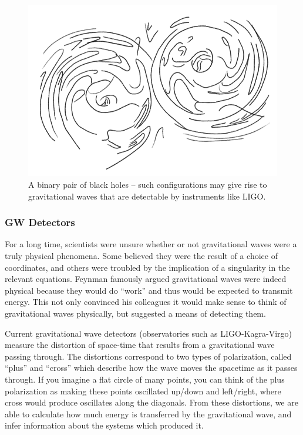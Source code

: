\begin{figure}
    \centering
    \includegraphics[width=0.8\linewidth]{img/stylized_bbh.png}
    \caption{A binary pair of black holes -- such configurations may give rise to gravitational waves that are detectable by instruments like LIGO.}
    \label{fig:stylized_bbh}
\end{figure}

\subsubsection{GW Detectors}

For a long time, scientists were unsure whether or not gravitational waves were a truly physical phenomena. Some believed they were the result of a choice of coordinates, and others were troubled by the implication of a singularity in the relevant equations. Feynman famously argued gravitational waves were indeed physical because they would do ``work'' and thus would be expected to transmit energy. This not only convinced his colleagues it would make sense to think of gravitational waves physically, but suggested a means of detecting them.

Current gravitational wave detectors (observatories such as LIGO-Kagra-Virgo) measure the distortion of space-time that results from a gravitational wave passing through. The distortions correspond to two types of polarization, called ``plus'' and ``cross'' which describe how the wave moves the spacetime as it passes through. If you imagine a flat circle of many points, you can think of the plus polarization as making these points oscillated up/down and left/right, where cross would produce oscillates along the diagonals. From these distortions, we are able to calculate how much energy is transferred by the gravitational wave, and infer information about the systems which produced it.

